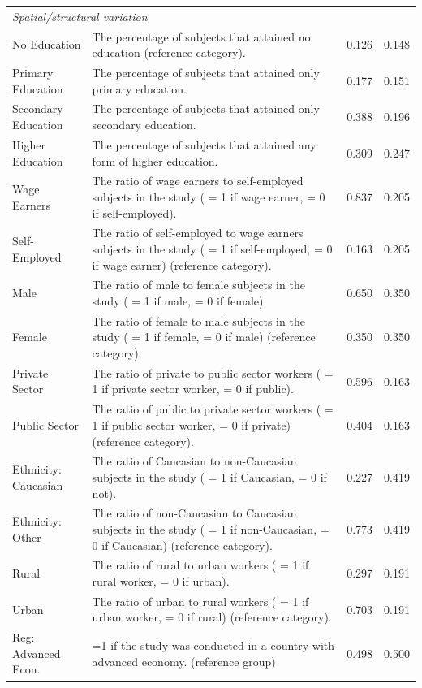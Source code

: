 \begin{singlespace}
\begin{scriptsize}
\begin{longtable}{
  @{\hskip\tabcolsep\extracolsep\fill}
  l
  p{0.55\hsize}
  cc
  @{}
  }
  \multicolumn{4}{l}{\emph{Spatial/structural variation}}\\
  No Education & The percentage of subjects that attained no education (reference category). & 0.126 & 0.148 \\
  Primary Education & The percentage of subjects that attained only primary education. & 0.177 & 0.151 \\
  Secondary Education & The percentage of subjects that attained only secondary education. & 0.388 & 0.196 \\
  Higher Education & The percentage of subjects that attained any form of higher education. & 0.309 & 0.247 \\
  Wage Earners & The ratio of wage earners to self-employed subjects in the study ( = 1 if wage earner, = 0 if self-employed). & 0.837 & 0.205 \\
  Self-Employed & The ratio of self-employed to wage earners subjects in the study ( = 1 if self-employed, = 0 if wage earner) (reference category). & 0.163 & 0.205 \\
  Male & The ratio of male to female subjects in the study ( = 1 if male, = 0 if female). & 0.650 & 0.350 \\
  Female & The ratio of female to male subjects in the study ( = 1 if female, = 0 if male) (reference category). & 0.350 & 0.350 \\
  Private Sector & The ratio of private to public sector workers ( = 1 if private sector worker, = 0 if public). & 0.596 & 0.163 \\
  Public Sector & The ratio of public to private sector workers ( = 1 if public sector worker, = 0 if private) (reference category). & 0.404 & 0.163 \\
  Ethnicity: Caucasian & The ratio of Caucasian to non-Caucasian subjects in the study ( = 1 if Caucasian, = 0 if not). & 0.227 & 0.419 \\
  Ethnicity: Other & The ratio of non-Caucasian to Caucasian subjects in the study ( = 1 if non-Caucasian, = 0 if Caucasian) (reference category). & 0.773 & 0.419 \\
  Rural & The ratio of rural to urban workers ( = 1 if rural worker, = 0 if urban). & 0.297 & 0.191 \\
  Urban & The ratio of urban to rural workers ( = 1 if urban worker, = 0 if rural) (reference category). & 0.703 & 0.191 \\
  Reg: Advanced Econ. & =1 if the study was conducted in a country with advanced economy. (reference group) & 0.498 & 0.500 \\

\end{longtable}
\end{scriptsize}
\end{singlespace}
